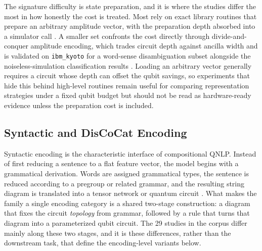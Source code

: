 \documentclass{ieeeaccess}
\begin{document}
The signature difficulty is state preparation, and it is where the studies differ the most in how honestly the cost is treated. Most rely on exact library routines that prepare an arbitrary amplitude vector, with the preparation depth absorbed into a simulator call \cite{buonaiuto_quantum_2024,guarasci_applying_2025}. A smaller set confronts the cost directly through divide-and-conquer amplitude encoding, which trades circuit depth against ancilla width and is validated on \texttt{ibm\_kyoto} for a word-sense disambiguation subset alongside the noiseless-simulation classification results \cite{zhang_entangled_2024}. Loading an arbitrary vector generally requires a circuit whose depth can offset the qubit savings, so experiments that hide this behind high-level routines remain useful for comparing representation strategies under a fixed qubit budget but should not be read as hardware-ready evidence unless the preparation cost is included.

\subsection{Syntactic and DisCoCat Encoding}
\label{subsec:syntactic_encoding}
Syntactic encoding is the characteristic interface of compositional QNLP. Instead of first reducing a sentence to a flat feature vector, the model begins with a grammatical derivation. Words are assigned grammatical types, the sentence is reduced according to a pregroup or related grammar, and the resulting string diagram is translated into a tensor network or quantum circuit \cite{coecke2010mathematical}. What makes the family a single encoding category is a shared two-stage construction: a diagram that fixes the circuit \emph{topology} from grammar, followed by a rule that turns that diagram into a parameterized qubit circuit. The 29 studies in the corpus differ mainly along these two stages, and it is these differences, rather than the downstream task, that define the encoding-level variants below.
\end{document}
